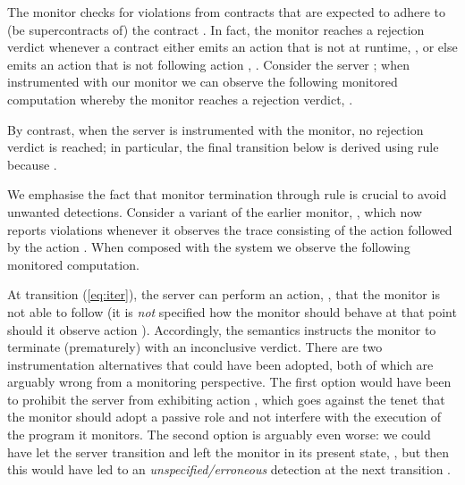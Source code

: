\begin{example} \label{ex:monit-contract}
   The monitor  checks for violations from  contracts that are expected to adhere to (\ie be supercontracts of) the contract  . In fact, the monitor reaches a rejection verdict whenever  a contract either emits an action that is not  at runtime, , or else  emits an action that is not  following action , .  Consider the server ; when instrumented with our monitor we can observe the following monitored computation whereby the monitor reaches a rejection verdict, \no.
   
   By contrast, when the server   is instrumented with the monitor, no rejection verdict is reached; in particular, the final transition below is derived using rule  because .
   
We emphasise the fact that monitor termination through rule  is crucial to avoid unwanted detections.  Consider a variant of the earlier  monitor,  , which now reports violations whenever it observes the trace consisting of the action  followed by the action . When composed with the system  we observe the following monitored computation.

   At transition (\ref{eq:iter}), the server can perform an action, , that the monitor is not able to follow (\ie it is \emph{not} specified how the monitor should behave at that point should it observe action ).  Accordingly, the semantics instructs the monitor to terminate (prematurely) with an inconclusive verdict.   There are two instrumentation alternatives that could have been adopted, both of which are arguably wrong from a monitoring perspective.  The first option would have been to prohibit the server from exhibiting action , which goes against the tenet that the monitor should adopt a passive role and not interfere with the execution of the program it monitors.  The second option is arguably even worse: we could have let the server transition and left the monitor in its present state, \ie    
   , 
   but then this would have led to an \emph{unspecified/erroneous} detection at the next transition 
   .
    \exqed
\end{example}


